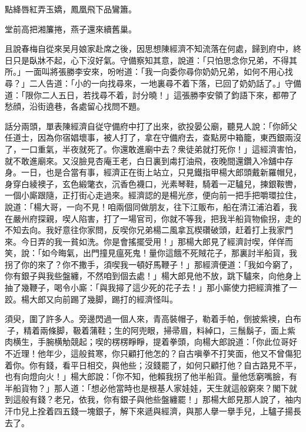 \begin{myquote}
點絳唇紅弄玉嬌，鳳凰飛下品鸞簫。

堂前高把湘簾捲，燕子還來續舊巢。
\end{myquote}

且說春梅自從來吴月娘家赴席之後，因思想陳經濟不知流落在何處，歸到府中，終日只是臥牀不起，心下沒好氣。守備察知其意，說道：「只怕思念你兄弟，不得其所。」一面叫將張勝李安來，吩咐道：「我一向委你尋你奶奶兄弟，如何不用心找尋？」二人告道：「小的一向找尋來，一地裏尋不着下落，已回了奶奶話了。」守備道：「限你二人五日，若找尋不着，討分曉！」這張勝李安領了鈞語下來，都帶了愁顔，沿街遶巷，各處留心找問不題。

話分兩頭，單表陳經濟自従守備府中打了出來，欲投晏公廟，聽見人說：「你師父任道士，因為你宿娼壞事，被人打了，拿在守備府去，查點房中箱籠，東西銀兩沒了，一口重氣，半夜就死了。你還敢進廟中去？衆徒弟就打死你！」這經濟害怕，就不敢進廟來。又沒臉見杏庵王老，白日裏到䖏打油飛，夜晚間還鑽入冷舖中存身。一日，也是合當有事，經濟正在街上站立，只見鐵指甲楊大郎頭戴新羅帽兒，身穿白綾襖子，玄色緞氅衣，沉香色襪口，光素琴鞋，騎着一疋驢兒，揀銀鞍轡，一個小廝跟隨，正打街心走過來。經濟認的是楊光彦，便向前一把手把嚼環拉住，說道：「楊大哥，一向不見！咱兩個同做朋友，往下江販布，船在清江浦泊着，我在嚴州府探親，喫人陷害，打了一場官司，你就不等我，把我半船貨物偸拐，走的不知去向。我好意往你家問，反喫你兄弟楊二風拿瓦楔礸破頭，赶着打上我家門來。今日弄的我一貧如洗。你是會搖擺受用！」那楊大郎見了經濟討喫，佯佯而笑，說：「如今晦氣，出門撞見瘟死鬼！量你這餓不死賊花子，那裏討半船貨，我拐了你的來了？你不撒手，須喫我一頓好馬鞭子！」那經濟便道：「我如今窮了，你有銀子與我些盤纏，不然咱到個去處！」楊大郎見他不放，跳下驢來，向他身上抽了幾鞭子，喝令小廝：「與我撏了這少死的花子去！」那小廝使力把經濟推了一跤。楊大郎又向前踢了幾脚，踢打的經濟怪叫。

須臾，圍了許多人。旁邊閃過一個人來，青高裝帽子，勒着手帕，倒披紫襖，白布𧜽子，精着兩條脚，靸着蒲鞋；生的阿兜眼，掃帚眉，料綽口，三鬚鬍子，面上紫肉横生，手腕横觔競起；喫的楞楞睜睜，提着拳頭，向楊大郎說道：「你此位哥好不近理！他年少，這般貧寒，你只顧打他怎的？自古嗔拳不打笑面，他又不曾傷犯着你。你有錢，看平日相交，與他些；沒錢罷了，如何只顧打他？自古路見不平，也有向燈向火！」楊大郎說：「你不知，他賴我拐了他半船貨。量他恁窮嘴臉，有半船貨物？」那人道：「想必他當時也是根基人家娃娃，天生就這般窮來？閣下就到這般有錢？老兄，依我，你有銀子與他些盤纏罷！」那楊大郎見那人說了，袖内汗巾兒上拴着四五錢一塊銀子，解下來遞與經濟，與那人擧一擧手兒，上驢子揚長去了。

